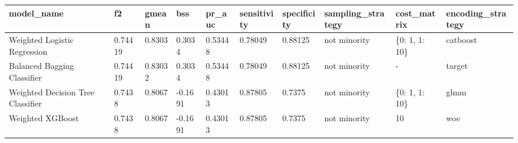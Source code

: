 \begin{tabular}{|l|l|l|l|l|l|l|l|l|l|}
\hline
\textbf{model\_name}              & \textbf{f2} & \textbf{gmean} & \textbf{bss} & \textbf{pr\_auc} & \textbf{sensitivity} & \textbf{specificity} & \textbf{sampling\_strategy} & \textbf{cost\_matrix} & \textbf{encoding\_strategy} \\ \hline
Weighted Logistic Regression      & 0.74419     & 0.8303         & 0.3034       & 0.53448          & 0.78049              & 0.88125              & not minority                & \{0: 1, 1: 10\}       & catboost                    \\ \hline
Balanced Bagging Classifier       & 0.74419     & 0.83032        & 0.3034       & 0.53448          & 0.78049              & 0.88125              & not minority                & -                     & target                      \\ \hline
Weighted Decision Tree Classifier & 0.7438      & 0.8067         & -0.1691      & 0.43013          & 0.87805              & 0.7375               & not minority                & \{0: 1, 1: 10\}       & glmm                        \\ \hline
Weighted XGBoost                  & 0.7438      & 0.8067         & -0.1691      & 0.43013          & 0.87805              & 0.7375               & not minority                & 10                    & woe                         \\ \hline
\end{tabular}